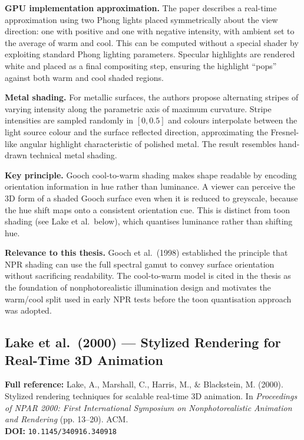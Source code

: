 \documentclass[11pt, a4paper]{article}
\begin{document}
\textbf{GPU implementation approximation.} The paper describes a real-time approximation using two Phong lights placed symmetrically about the view direction: one with positive and one with negative intensity, with ambient set to the average of warm and cool. This can be computed without a special shader by exploiting standard Phong lighting parameters. Specular highlights are rendered white and placed as a final compositing step, ensuring the highlight ``pops'' against both warm and cool shaded regions.

\textbf{Metal shading.} For metallic surfaces, the authors propose alternating stripes of varying intensity along the parametric axis of maximum curvature. Stripe intensities are sampled randomly in $[0, 0.5]$ and colours interpolate between the light source colour and the surface reflected direction, approximating the Fresnel-like angular highlight characteristic of polished metal. The result resembles hand-drawn technical metal shading.

\textbf{Key principle.} Gooch cool-to-warm shading makes shape readable by encoding orientation information in hue rather than luminance. A viewer can perceive the 3D form of a shaded Gooch surface even when it is reduced to greyscale, because the hue shift maps onto a consistent orientation cue. This is distinct from toon shading (see Lake et al.\ below), which quantises luminance rather than shifting hue.

\textbf{Relevance to this thesis.} Gooch et al.\ (1998) established the principle that NPR shading can use the full spectral gamut to convey surface orientation without sacrificing readability. The cool-to-warm model is cited in the thesis as the foundation of nonphotorealistic illumination design and motivates the warm/cool split used in early NPR tests before the toon quantisation approach was adopted.

\vspace{8pt}
\subsection{Lake et al.\ (2000) --- Stylized Rendering for Real-Time 3D Animation}

\begin{refbox}
\textbf{Full reference:} Lake, A., Marshall, C., Harris, M., \& Blackstein, M. (2000). Stylized rendering techniques for scalable real-time 3D animation. In \textit{Proceedings of NPAR 2000: First International Symposium on Nonphotorealistic Animation and Rendering} (pp. 13--20). ACM.\\[4pt]
\textbf{DOI:} \texttt{10.1145/340916.340918}
\end{refbox}
\end{document}

